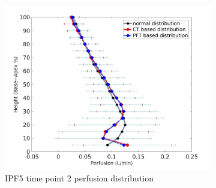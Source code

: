 \begin{figure}[htbp]
\begin{subfigure}{.6\linewidth}
  \includegraphics[width=\linewidth,trim={{.0\wd0} {.0\wd0} {.0\wd0} {.0\wd0}},clip]{Appendix/Image_AppexB/IPF501/IPF501_PerfusionAgainstLungHeight.jpg}
  \caption{IPF5 time point 2 perfusion distribution}
  \label{fig:IPF501VQDistribution-b}
\end{subfigure}
\begin{subfigure}{.6\linewidth}%

\end{subfigure}
\end{figure}
